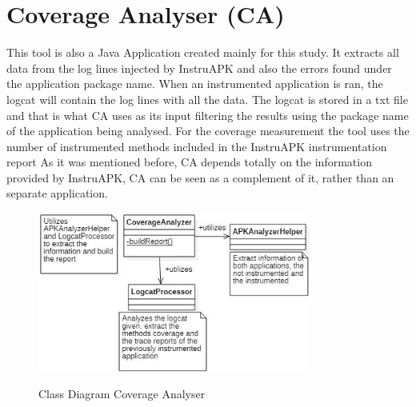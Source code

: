 \section{Coverage Analyser (CA)}\label{sec:ca}

This tool is also a Java Application created mainly for this study. It extracts all data from the log lines injected by InstruAPK and also the errors found under the application package name. When an instrumented application is ran, the logcat will contain the log lines with all the data. The logcat is stored in a txt file and that is what CA uses as its input filtering the results using the package name of the application being analysed. For the coverage measurement the tool uses the number of instrumented methods included in the InstruAPK instrumentation report As it was mentioned before, CA depends totally on the information provided by InstruAPK, CA can be seen as a complement of it, rather than an separate application.

\begin{figure}[h]
\centering
\includegraphics[width=0.8\textwidth]{../Figures/ClassDiagramCA.jpg}
\label{fig:ca}
\caption{Class Diagram Coverage Analyser}
\end{figure}

